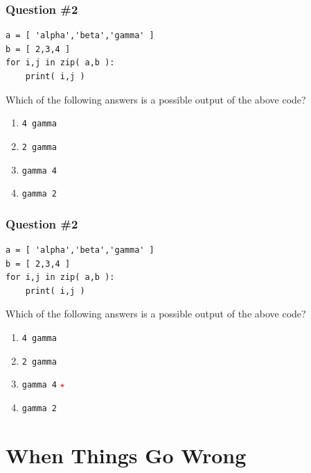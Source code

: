 \documentclass[11pt]{beamer}
\newcommand{\correctstar}{\textcolor{red}{$\star$}}
\begin{document}
\begin{frame}[fragile]
  \frametitle{Question \#2}
  \Enlarge

  \begin{Verbatim}
a = [ 'alpha','beta','gamma' ]
b = [ 2,3,4 ]
for i,j in zip( a,b ):
    print( i,j )
  \end{Verbatim}

  Which of the following answers is a possible output of the above code?

  \begin{enumerate}[label=\Alph*]
  \item  \texttt{4 gamma}
  \item  \texttt{2 gamma}
  \item  \texttt{gamma 4}
  \item  \texttt{gamma 2}
  \end{enumerate}
\end{frame}

\begin{frame}[fragile]
  \frametitle{Question \#2}
  \Enlarge

  \begin{Verbatim}
a = [ 'alpha','beta','gamma' ]
b = [ 2,3,4 ]
for i,j in zip( a,b ):
    print( i,j )
  \end{Verbatim}

  Which of the following answers is a possible output of the above code?

  \begin{enumerate}[label=\Alph*]
  \item  \texttt{4 gamma}
  \item  \texttt{2 gamma}
  \item  \texttt{gamma 4}  \correctstar
  \item  \texttt{gamma 2}
  \end{enumerate}
\end{frame}

\section{When Things Go Wrong}
\end{document}
